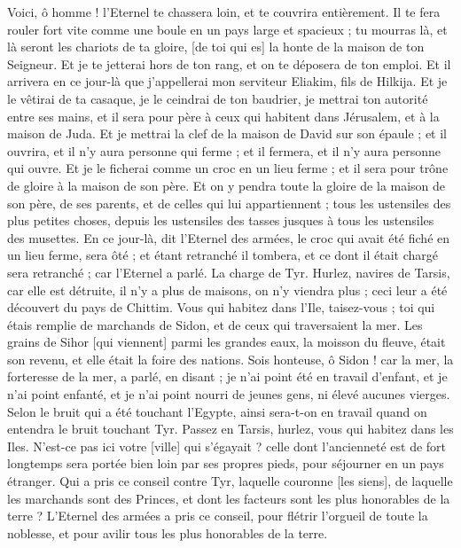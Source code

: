 \begin{multicols}{2}
Voici, ô homme ! l'Eternel te chassera loin, et te couvrira entièrement.
Il te fera rouler fort vite comme une boule en un pays large et spacieux ; tu mourras là, et là seront les chariots de ta gloire, [de toi qui es] la honte de la maison de ton Seigneur.
Et je te jetterai hors de ton rang, et on te déposera de ton emploi.
Et il arrivera en ce jour-là que j'appellerai mon serviteur Eliakim, fils de Hilkija.
Et je le vêtirai de ta casaque, je le ceindrai de ton baudrier, je mettrai ton autorité entre ses mains, et il sera pour père à ceux qui habitent dans Jérusalem, et à la maison de Juda.
Et je mettrai la clef de la maison de David sur son épaule ; et il ouvrira, et il n'y aura personne qui ferme ; et il fermera, et il n'y aura personne qui ouvre.
Et je le ficherai comme un croc en un lieu ferme ; et il sera pour trône de gloire à la maison de son père.
Et on y pendra toute la gloire de la maison de son père, de ses parents, et de celles qui lui appartiennent ; tous les ustensiles des plus petites choses, depuis les ustensiles des tasses jusques à tous les ustensiles des musettes.
En ce jour-là, dit l'Eternel des armées, le croc qui avait été fiché en un lieu ferme, sera ôté ; et étant retranché il tombera, et ce dont il était chargé sera retranché ; car l'Eternel a parlé.
\VerseOne{}La charge de Tyr. Hurlez, navires de Tarsis, car elle est détruite, il n'y a plus de maisons, on n'y viendra plus ; ceci leur a été découvert du pays de Chittim.
Vous qui habitez dans l'Ile, taisez-vous ; toi qui étais remplie de marchands de Sidon, et de ceux qui traversaient la mer.
Les grains de Sihor [qui viennent] parmi les grandes eaux, la moisson du fleuve, était son revenu, et elle était la foire des nations.
Sois honteuse, ô Sidon ! car la mer, la forteresse de la mer, a parlé, en disant ; je n'ai point été en travail d'enfant, et je n'ai point enfanté, et je n'ai point nourri de jeunes gens, ni élevé aucunes vierges.
Selon le bruit qui a été touchant l'Egypte, ainsi sera-t-on en travail quand on entendra le bruit touchant Tyr.
Passez en Tarsis, hurlez, vous qui habitez dans les Iles.
N'est-ce pas ici votre [ville] qui s'égayait ? celle dont l'ancienneté est de fort longtemps sera portée bien loin par ses propres pieds, pour séjourner en un pays étranger.
Qui a pris ce conseil contre Tyr, laquelle couronne [les siens], de laquelle les marchands sont des Princes, et dont les facteurs sont les plus honorables de la terre ?
L'Eternel des armées a pris ce conseil, pour flétrir l'orgueil de toute la noblesse, et pour avilir tous les plus honorables de la terre.

\end{multicols}
